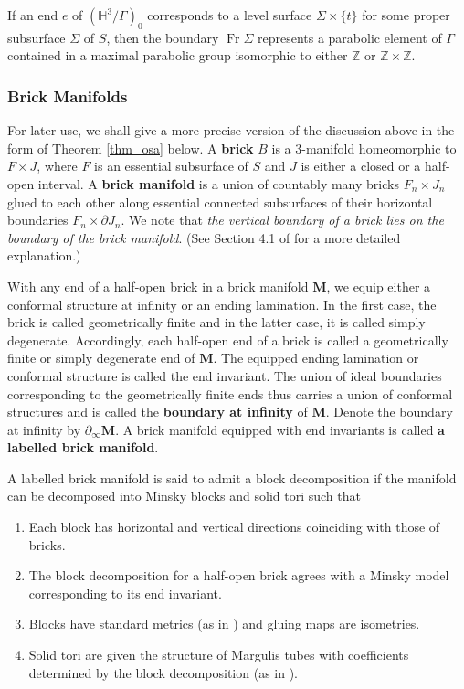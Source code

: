 \documentclass{amsart}
\theoremstyle{definition}
\newcommand{\Ga}{\Gamma}
\newcommand{\Fr}{\operatorname{Fr}}
\newcommand\HHH{{\mathbb H}}
\newcommand\Z{{\mathbb Z}}
\begin{document}
If an end $e$ of $(\HHH^3/\Gamma)_0$ corresponds to a level surface $\Sigma \times \{t\}$  for some proper subsurface $\Sigma$ of $S$, then the boundary $\Fr \Sigma$ represents a parabolic element of $\Ga$ contained in a maximal parabolic group  isomorphic to either $\Z$ or $\Z \times \Z$.




\subsubsection{Brick Manifolds}\label{brickmfld}
For later use, we shall give a more precise version of the discussion above in the form of Theorem \ref{thm_osa} below.
A {\bf brick} $B$ is a 3-manifold homeomorphic to $F\times J$, where $F$ is an essential subsurface of $S$  and
 $J$  is either a closed or a half-open interval.
A {\bf brick manifold} is a union of countably many bricks $F_n\times J_n$  glued to each other along essential connected subsurfaces of their horizontal boundaries
$F_n\times \partial J_n$.
We note that {\em the vertical boundary of a brick lies on the boundary of the brick manifold}.
(See Section 4.1 of \cite{OhD} for a more detailed explanation.)

With any
 end of a half-open brick in  a brick manifold $\mathbf M$, we equip either a conformal structure at infinity or an ending lamination. In the first case, the brick is called
 geometrically finite  and in the latter case, it is called simply degenerate. Accordingly, 
each half-open end of a brick is called a geometrically finite or simply degenerate end of $\mathbf M$.
The equipped ending lamination or  conformal structure is called the end invariant.
The union of ideal boundaries corresponding to the geometrically finite ends thus carries a union of conformal structures and is
called the {\bf boundary at infinity} of $\mathbf M$.  Denote the  boundary at infinity by $\partial_\infty \mathbf M$.
A brick manifold equipped with  end invariants is called {\bf a labelled brick manifold}.

A labelled brick manifold is said to admit a block decomposition if the manifold can be decomposed into 
Minsky blocks  \cite{minsky-elc1} and solid tori  such  that 
\begin{enumerate}
	\item Each block has horizontal and vertical directions coinciding with those of bricks.
	\item The block decomposition for a half-open brick agrees with a Minsky model corresponding to its end invariant.
	\item Blocks have standard metrics (as in \cite{minsky-elc1}) and  gluing maps are isometries.
	\item Solid tori are given the structure of  Margulis tubes with coefficients  determined by the block decomposition (as in \cite{minsky-elc1}).
\end{enumerate}
\end{document}
